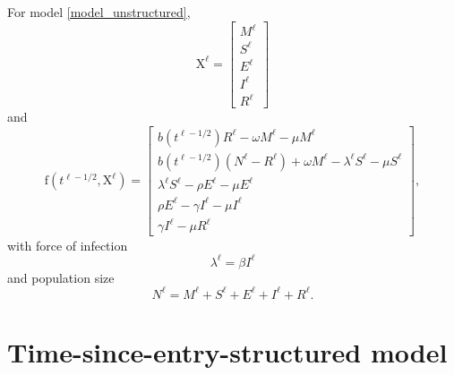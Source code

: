 \documentclass{jpmarticle}
\renewcommand{\vec}[1]{\boldsymbol{\mathrm{#1}}}
\begin{document}
For model \eqref{model_unstructured},
\begin{equation}
  \vec{X}^{\ell} =
  \begin{bmatrix}
    M^{\ell} \\ S^{\ell} \\ E^{\ell} \\ I^{\ell} \\ R^{\ell}
  \end{bmatrix}
\end{equation}
and
\begin{equation}
  \vec{f}\left(t^{\ell - 1 / 2}, \vec{X}^{\ell}\right) =
  \begin{bmatrix}
    b\left(t^{\ell - 1 / 2}\right) R^{\ell}
    - \omega M^{\ell}
    - \mu M^{\ell}
    \\
    b\left(t^{\ell - 1 / 2}\right) \left(N^{\ell} - R^{\ell}\right)
    + \omega M^{\ell}
    - \lambda^{\ell} S^{\ell}
    - \mu S^{\ell}
    \\
    \lambda^{\ell} S^{\ell}
    - \rho E^{\ell}
    - \mu E^{\ell}
    \\
    \rho E^{\ell}
    - \gamma I^{\ell}
    - \mu I^{\ell}
    \\
    \gamma I^{\ell}
    - \mu R^{\ell}
  \end{bmatrix},
\end{equation}
with force of infection
\begin{equation}
  \lambda^{\ell} = \beta I^{\ell}
\end{equation}
and population size
\begin{equation}
  N^{\ell} = M^{\ell} + S^{\ell} + E^{\ell} + I^{\ell} + R^{\ell}.
\end{equation}


\section{Time-since-entry-structured model}
\end{document}
